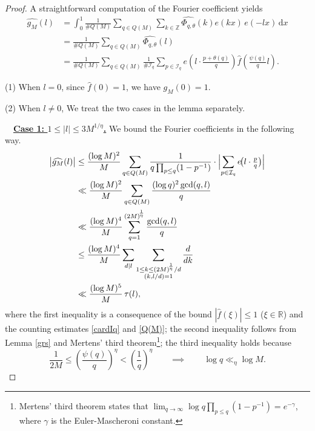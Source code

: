 \documentclass[12pt,a4paper,twoside]{article}
\begin{document}
\begin{proof} A straightforward computation of the Fourier coefficient yields
\begin{align*}
\widehat{g_M}(l)
&= \int_{0}^{1} \frac{1}{\#Q(M)} \sum_{q\in Q(M)} \sum_{k\in\mathbb{Z}} \widehat{\Phi_{q,\theta}}(k) e(kx) \, e(-lx) \, \mathrm{d}x \\
&= \frac{1}{\#Q(M)} \sum_{q\in Q(M)} \widehat{\Phi_{q,\theta}}(l) \\
&= \frac{1}{\#Q(M)} \sum_{q\in Q(M)} \frac{1}{\#\mathcal{I}_q} \sum_{p\in\mathcal{I}_q} e\!\left(l\cdot\frac{p+\theta(q)}{q}\right) \widehat{f}\!\left(\frac{\psi(q)}{q}l\right).
\end{align*}

\noindent(1) When \(l = 0\), since \(\widehat{f}(0) = 1\), we have \(\widehat{g_M}(0) = 1\).

\smallskip

\noindent(2) When \(l \neq 0\), We treat the two cases in the lemma separately.

\medskip

\noindent{}~~\underline{\textbf{Case 1: $1\le |l|\le 3M^{1/\eta}$.}} We bound the Fourier coefficients in the following way.
\begin{align*}
\bigl|\widehat{g_M}(l)\bigr|
&\le \frac{(\log M)^2}{M} \sum_{q\in Q(M)} \frac{1}{q\prod_{p\le q}(1-p^{-1})} \cdot \Bigl|\sum_{p\in\mathcal{I}_q} e\!\bigl(l\cdot \tfrac{p}{q}\bigr)\Bigr| \\
&\ll \frac{(\log M)^2}{M} \sum_{q\in Q(M)} \frac{(\log q)^2 \gcd(q,l)}{q} \\
&\ll \frac{(\log M)^4}{M} \sum_{q=1}^{(2M)\!^{\frac{1}{\eta}}} \frac{\gcd(q,l)}{q} \\
&\le \frac{(\log M)^4}{M} \sum_{d\mid l} \sum_{\substack{1\le k\le (2M)\!^{\frac{1}{\eta}}/d \\ (k,l/d)=1}} \frac{d}{dk} \\
&\ll \frac{(\log M)^5}{M} \, \tau(l),
\end{align*}
where the first inequality is a consequence of the bound \(|\widehat{f}(\xi)| \le 1\) (\(\xi \in \mathbb{R}\)) and the counting estimates \eqref{cardIq} and \eqref{Q(M)};
the second inequality follows from Lemma \ref{grs} and Mertens' third theorem\footnote{Mertens' third theorem states that $\lim_{q\to\infty} \log q \prod_{p\le q}(1-p^{-1}) = e^{-\gamma}$, where $\gamma$ is the Euler-Mascheroni constant.}; the third inequality holds because
\[\frac{1}{2M}\le \left(\frac{\psi(q)}{q}\right)^{\eta}< \left(\frac{1}{q}\right)^{\eta} \qquad \implies \qquad \log q \ll_{\eta} \log M.\]


\end{proof}
\end{document}

